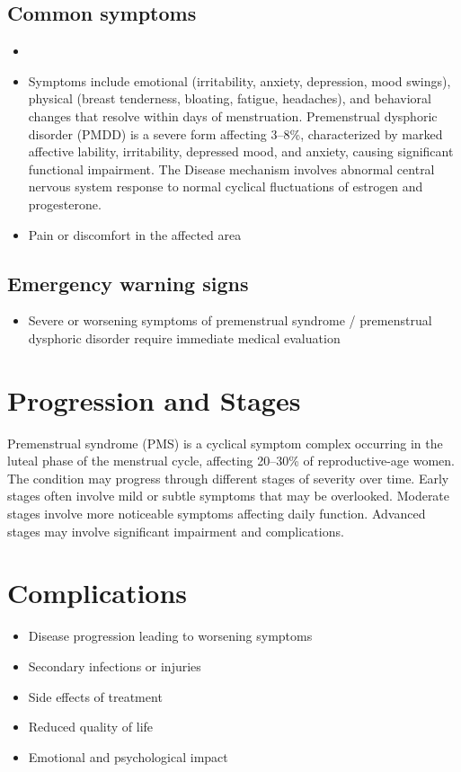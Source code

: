 \subsection{Common symptoms}
\begin{itemize}[noitemsep]
  \item \item Symptoms include emotional (irritability, anxiety, depression, mood swings), physical (breast tenderness, bloating, fatigue, headaches), and behavioral changes that resolve within days of menstruation. Premenstrual dysphoric disorder (PMDD) is a severe form affecting 3--8\%, characterized by marked affective lability, irritability, depressed mood, and anxiety, causing significant functional impairment. The Disease mechanism involves abnormal central nervous system response to normal cyclical fluctuations of estrogen and progesterone.

  \item Pain or discomfort in the affected area
  \end{itemize}

\subsection{Emergency warning signs}
\begin{itemize}[noitemsep]
  \item Severe or worsening symptoms of premenstrual syndrome / premenstrual dysphoric disorder require immediate medical evaluation
\end{itemize}
\section{Progression and Stages}
Premenstrual syndrome (PMS) is a cyclical symptom complex occurring in the luteal phase of the menstrual cycle, affecting 20--30\% of reproductive-age women. The condition may progress through different stages of severity over time. Early stages often involve mild or subtle symptoms that may be overlooked. Moderate stages involve more noticeable symptoms affecting daily function. Advanced stages may involve significant impairment and complications.
\section{Complications}
\begin{itemize}[noitemsep]
  \item Disease progression leading to worsening symptoms
  \item Secondary infections or injuries
  \item Side effects of treatment
  \item Reduced quality of life
  \item Emotional and psychological impact
\end{itemize}
